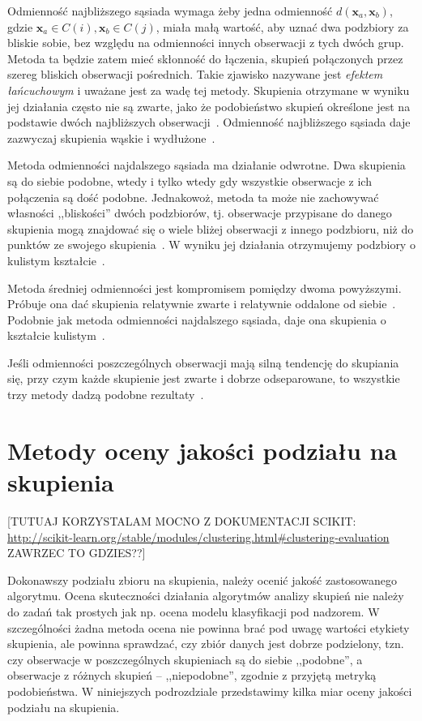 \documentclass{praca1}
\begin{document}
Odmienność najbliższego sąsiada wymaga żeby jedna odmienność $d(\mathbf{x}_a, \mathbf{x}_b)$, gdzie $\mathbf{x}_a \in C(i), \mathbf{x}_b \in C(j)$, miała małą wartość, aby uznać dwa podzbiory za bliskie sobie, bez względu na odmienności innych obserwacji z tych dwóch grup. Metoda ta będzie zatem mieć skłonność do łączenia, skupień połączonych przez szereg bliskich obserwacji pośrednich. Takie zjawisko nazywane jest \emph{efektem łańcuchowym} i uważane jest za wadę tej metody. Skupienia otrzymane w wyniku jej działania często nie są zwarte, jako że podobieństwo skupień określone jest na podstawie dwóch najbliższych obserwacji~\cite{Hastie2009:elements}. Odmienność najbliższego sąsiada daje zazwyczaj skupienia wąskie i wydłużone~\cite{Koronacki2005:statystyczne}. 

Metoda odmienności najdalszego sąsiada ma działanie odwrotne. Dwa skupienia są do siebie podobne, wtedy i tylko wtedy gdy wszystkie obserwacje z ich połączenia są dość podobne. Jednakowoż, metoda ta może nie zachowywać własności ,,bliskości'' dwóch podzbiorów, tj. obserwacje przypisane do danego skupienia mogą znajdować się o wiele bliżej obserwacji z innego podzbioru, niż do punktów ze swojego skupienia~\cite{Hastie2009:elements}. W wyniku jej działania otrzymujemy podzbiory o kulistym kształcie~\cite{Koronacki2005:statystyczne}.

Metoda średniej odmienności jest kompromisem pomiędzy dwoma powyższymi. Próbuje ona dać skupienia relatywnie zwarte i relatywnie oddalone od siebie~\cite{Hastie2009:elements}. Podobnie jak metoda odmienności najdalszego sąsiada, daje ona skupienia o kształcie kulistym~\cite{Koronacki2005:statystyczne}.

Jeśli odmienności poszczególnych obserwacji mają silną tendencję do skupiania się, przy czym każde skupienie jest zwarte i dobrze odseparowane, to wszystkie trzy metody dadzą podobne rezultaty~\cite{Hastie2009:elements}.

\section{Metody oceny jakości podziału na skupienia}

[TUTUAJ KORZYSTALAM MOCNO Z DOKUMENTACJI SCIKIT: \url{http://scikit-learn.org/stable/modules/clustering.html#clustering-evaluation}  ZAWRZEC TO GDZIES??]

Dokonawszy podziału zbioru na skupienia, należy ocenić jakość zastosowanego algorytmu. Ocena skuteczności działania algorytmów analizy skupień nie należy do zadań tak prostych jak np. ocena modelu klasyfikacji pod nadzorem. W szczególności żadna metoda ocena nie powinna brać pod uwagę wartości etykiety skupienia, ale powinna sprawdzać, czy zbiór danych jest dobrze podzielony, tzn. czy obserwacje w poszczególnych skupieniach są do siebie ,,podobne'', a obserwacje z różnych skupień -- ,,niepodobne'', zgodnie z przyjętą metryką podobieństwa. W niniejszych podrozdziale przedstawimy kilka miar oceny jakości podziału na skupienia.
\end{document}
